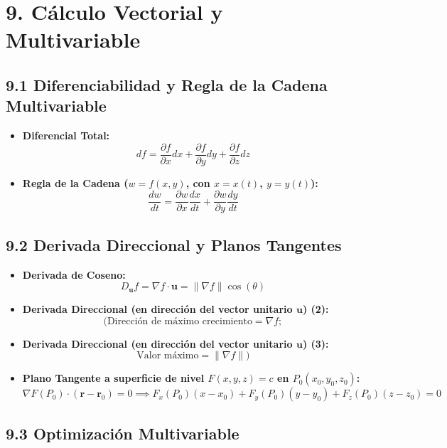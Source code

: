 \documentclass[11pt,a4paper]{article}
\begin{document}
\section*{9. Cálculo Vectorial y Multivariable}

\subsection*{9.1 Diferenciabilidad y Regla de la Cadena Multivariable}

\begin{itemize}
  \item \textbf{Diferencial Total:}
  \[
    df = \frac{\partial f}{\partial x} dx + \frac{\partial f}{\partial y} dy + \frac{\partial f}{\partial z} dz
  \]
  \item \textbf{Regla de la Cadena ($w = f(x, y)$, con $x = x(t)$, $y = y(t)$):}
  \[
    \frac{dw}{dt} = \frac{\partial w}{\partial x}\frac{dx}{dt} + \frac{\partial w}{\partial y}\frac{dy}{dt}
  \]
\end{itemize}

\subsection*{9.2 Derivada Direccional y Planos Tangentes}

\begin{itemize}
  \item \textbf{Derivada de Coseno:}
  \[
    D_{\mathbf{u}} f = \nabla f \cdot \mathbf{u} = \|\nabla f\|\cos(\theta)
  \]
  \item \textbf{Derivada Direccional (en dirección del vector unitario $\mathbf{u}$) (2):}
  \[
    (\text{Dirección de máximo crecimiento} = \nabla f;
  \]
  \item \textbf{Derivada Direccional (en dirección del vector unitario $\mathbf{u}$) (3):}
  \[
    \text{Valor máximo} = \|\nabla f\|)
  \]
  \item \textbf{Plano Tangente a superficie de nivel $F(x, y, z) = c$ en $P_0(x_0, y_0, z_0)$:}
  \[
    \nabla F(P_0) \cdot (\mathbf{r} - \mathbf{r}_0) = 0 \implies F_x(P_0)(x - x_0) + F_y(P_0)(y - y_0) + F_z(P_0)(z - z_0) = 0
  \]
\end{itemize}

\subsection*{9.3 Optimización Multivariable}
\end{document}
